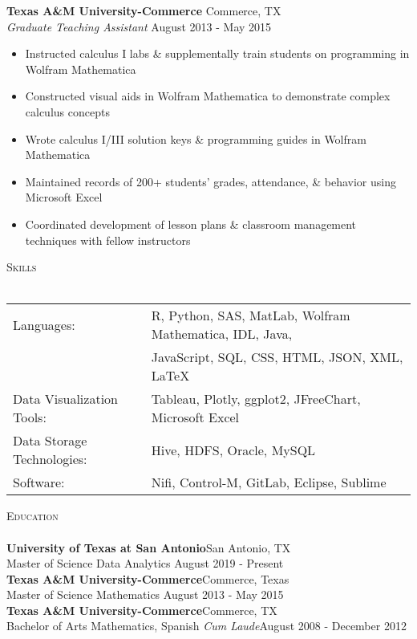 \documentclass[a4paper]{article}
\newcommand{\lineunder} {
    \vspace*{-8pt} \\
    \hspace*{-18pt} \hrulefill \\
}
\newcommand{\header} [1] {
    {\hspace*{-18pt}\vspace*{6pt} \textsc{#1}}
    \vspace*{-6pt} \lineunder
}
\begin{document}
\textbf{Texas A\&M University-Commerce} \hfill Commerce, TX\\
\textit{Graduate Teaching Assistant} \hfill August 2013 - May 2015\\
\vspace{-1mm}
\begin{itemize} \itemsep .5pt
	\item Instructed calculus I labs \& supplementally train students on programming in Wolfram Mathematica
	\item Constructed visual aids in Wolfram Mathematica to demonstrate complex calculus concepts
	\item Wrote calculus I/III solution keys \& programming guides in Wolfram Mathematica
	\item Maintained records of 200+ students’ grades, attendance, \& behavior using Microsoft Excel
	\item Coordinated development of lesson plans \& classroom management techniques with fellow instructors
\end{itemize}

\header{Skills}
\begin{tabular}{ l l }
	Languages: & R, Python, SAS, MatLab, Wolfram Mathematica, IDL, Java, \\
								& JavaScript, SQL, CSS, HTML, JSON, XML, LaTeX \\
	Data Visualization Tools:             & Tableau, Plotly, ggplot2, JFreeChart, Microsoft Excel                                       \\
	Data Storage Technologies:            & Hive, HDFS, Oracle, MySQL                                                                     \\
	Software:                             & Nifi, Control-M, GitLab, Eclipse, Sublime                                            \\
\end{tabular}
\vspace{2mm}

\header{Education}
\textbf{University of Texas at San Antonio}\hfill San Antonio, TX\\
Master of Science Data Analytics \hfill August 2019 - Present\\
\vspace{2mm}
\textbf{Texas A\&M University-Commerce}\hfill Commerce, Texas\\
Master of Science Mathematics \hfill August 2013 - May 2015\\
\vspace{2mm}
\textbf{Texas A\&M University-Commerce}\hfill Commerce, TX\\
Bachelor of Arts Mathematics, Spanish \textit{Cum Laude}\hfill August 2008 - December 2012\\
\vspace{2mm}
\end{document}
